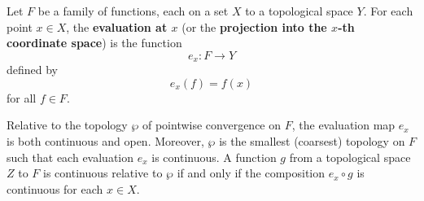 Let $F$ be a family of functions, each on a set $X$ to a topological space $Y$. For each point $x \in X$, the \textbf{evaluation at $x$} (or the \textbf{projection into the $x$-th coordinate space}) is the function
$$e_x : F \to Y$$
defined by
$$e_x(f) = f(x)$$
for all $f \in F$.

Relative to the topology $\wp$ of pointwise convergence on $F$, the evaluation map $e_x$ is both continuous and open. Moreover, $\wp$ is the smallest (coarsest) topology on $F$ such that each evaluation $e_x$ is continuous. A function $g$ from a topological space $Z$ to $F$ is continuous relative to $\wp$ if and only if the composition $e_x \circ g$ is continuous for each $x \in X$.
